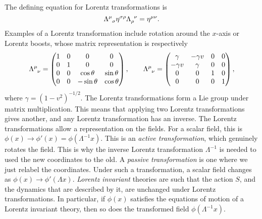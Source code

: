 The defining equation for Lorentz transformations is
\begin{equation}
  \Lambda\indices{^\mu_\sigma}\eta\indices{^\sigma^\rho} \Lambda\indices{_\rho ^\nu} = \eta\indices{^\mu^\nu}.
\end{equation}
Examples of a Lorentz transformation include rotation around the $x$-axis or Lorentz boosts, whose matrix representation is respectively
\begin{equation}
  \Lambda\indices{^\mu_\nu} = 
  \begin{pmatrix}
   1 & 0 & 0 & 0 \\
   0 & 1 & 0 & 0 \\
   0 & 0 & \cos\theta & \sin\theta \\
   0 & 0 & -\sin\theta & \cos\theta \\
  \end{pmatrix},
  \qquad
  \Lambda\indices{^\mu_\nu} = 
  \begin{pmatrix}
   \gamma & -\gamma v & 0 & 0 \\
   -\gamma v & \gamma & 0 & 0 \\
   0 & 0 & 1 & 0 \\
   0 & 0 & 0 & 1 \\
  \end{pmatrix},
\end{equation}
where $\gamma = (1- v^2)^{-1/2}$.
The Lorentz transformations form a Lie group under matrix multiplication. This means that applying two Lorentz transformations gives another, and any Lorentz transformation has an inverse.
The Lorentz transformations allow a representation on the fields.
For a scalar field, this is $\phi(x) \to \phi'(x) = \phi(\Lambda^{-1} x)$. This is an \emph{active transformation}, which genuinely rotates the field. This is why the inverse Lorentz transformation $\Lambda^{-1}$ is needed to used the new coordinates to the old.
A \emph{passive transformation} is one where we just relabel the coordinates. Under such a transformation, a scalar field changes as $\phi(x) \to \phi'(\Lambda x)$.
\emph{Lorentz invariant} theories are such that the action $S$, and the dynamics that are described by it, are unchanged under Lorentz transformations.
In particular, if $\phi(x)$ satisfies the equations of motion of a Lorentz invariant theory, then so does the transformed field $\phi(\Lambda^{-1} x)$.

